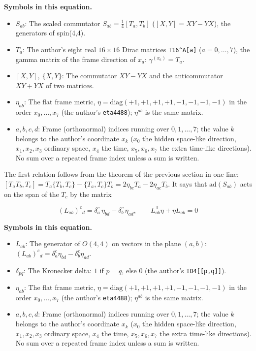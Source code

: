 \documentclass[
  10pt,
]{article}
\providecommand{\tightlist}{%
  \setlength{\itemsep}{0pt}\setlength{\parskip}{0pt}}
\begin{document}
\textbf{Symbols in this equation.}

\begin{itemize}
\tightlist
\item
  \(S_{ab}\): The scaled commutator \(S_{ab} = \tfrac14[T_a, T_b]\)
  (\([X, Y] = XY - YX\)), the generators of spin(4,4).
\item
  \(T_a\): The author's eight real \(16 \times 16\) Dirac matrices
  \texttt{T16\^{}A{[}a{]}} (\(a = 0, \dots, 7\)), the gamma matrix of
  the frame direction of \(x_a\): \(\gamma^{(x_a)} = T_a\).
\item
  \([X, Y],\ \{X, Y\}\): The commutator \(XY - YX\) and the
  anticommutator \(XY + YX\) of two matrices.
\item
  \(\eta_{ab}\): The flat frame metric,
  \(\eta = \mathrm{diag}(+1, +1, +1, +1, -1, -1, -1, -1)\) in the order
  \(x_0, \dots, x_7\) (the author's \texttt{eta4488}); \(\eta^{ab}\) is
  the same matrix.
\item
  \(a, b, c, d\): Frame (orthonormal) indices running over
  \(0, 1, \dots, 7\); the value \(k\) belongs to the author's coordinate
  \(x_k\) (\(x_0\) the hidden space-like direction, \(x_1, x_2, x_3\)
  ordinary space, \(x_4\) the time, \(x_5, x_6, x_7\) the extra
  time-like directions). No sum over a repeated frame index unless a sum
  is written.
\end{itemize}

The first relation follows from the theorem of the previous section in
one line:
\([T_aT_b, T_c] = T_a\{T_b, T_c\} - \{T_a, T_c\}T_b = 2\eta_{bc}T_a - 2\eta_{ac}T_b\).
It says that \(\mathrm{ad}(S_{ab})\) acts on the span of the \(T_c\) by
the matrix

\[
(L_{ab})^c{}_d = \delta^c_a\,\eta_{bd} - \delta^c_b\,\eta_{ad},\qquad L_{ab}^{\mathsf T}\eta + \eta L_{ab} = 0
\]

\textbf{Symbols in this equation.}

\begin{itemize}
\tightlist
\item
  \(L_{ab}\): The generator of \(O(4,4)\) on vectors in the plane
  \((a, b)\):
  \((L_{ab})^c{}_d = \delta^c_a\eta_{bd} - \delta^c_b\eta_{ad}\).
\item
  \(\delta_{pq}\): The Kronecker delta: \(1\) if \(p = q\), else \(0\)
  (the author's \texttt{ID4{[}{[}p,q{]}{]}}).
\item
  \(\eta_{ab}\): The flat frame metric,
  \(\eta = \mathrm{diag}(+1, +1, +1, +1, -1, -1, -1, -1)\) in the order
  \(x_0, \dots, x_7\) (the author's \texttt{eta4488}); \(\eta^{ab}\) is
  the same matrix.
\item
  \(a, b, c, d\): Frame (orthonormal) indices running over
  \(0, 1, \dots, 7\); the value \(k\) belongs to the author's coordinate
  \(x_k\) (\(x_0\) the hidden space-like direction, \(x_1, x_2, x_3\)
  ordinary space, \(x_4\) the time, \(x_5, x_6, x_7\) the extra
  time-like directions). No sum over a repeated frame index unless a sum
  is written.
\end{itemize}
\end{document}
